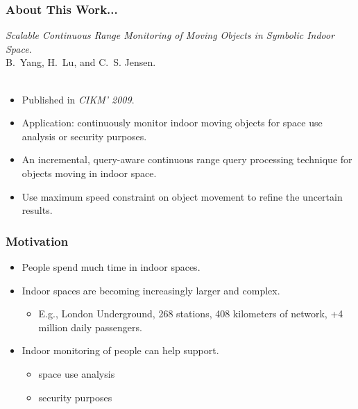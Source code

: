 \begin{frame}
\frametitle{About This Work...}

\emph{Scalable Continuous Range Monitoring of Moving Objects in Symbolic Indoor Space}.~\cite{DBLP:conf/cikm/YangLJ09} \\
B.~Yang, H.~Lu, and C.~S. Jensen.\\~\\

\begin{itemize}
  \item Published in \emph{CIKM' 2009}.
  \item Application: continuously monitor indoor moving objects for space use analysis or security purposes.
  \item An incremental, query-aware continuous range query processing technique for objects moving in indoor space.
  \item Use maximum speed constraint on object movement to refine the uncertain results.
\end{itemize}

\end{frame}

\begin{frame}
\frametitle{Motivation}

\begin{itemize}
  \item People spend much time in indoor spaces.

  \item Indoor spaces are becoming increasingly larger and complex.
    \begin{itemize}
      \item E.g., London Underground, 268 stations, 408 kilometers of network, +4 million daily passengers.
    \end{itemize}

  \item Indoor monitoring of people can help support.
    \begin{itemize}
      \item space use analysis
      \item security purposes
    \end{itemize}
\end{itemize}

\end{frame}


